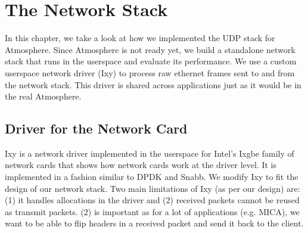 \chapter{The Network Stack} %

\label{Chapter4} %


In this chapter, we take a look at how we implemented the UDP stack for Atmosphere. Since Atmosphere is not ready yet, we build a standalone network stack that runs in the userspace and evaluate its performance. We use a custom userspace network driver (Ixy) to process raw ethernet frames sent to and from the network stack. This driver is shared across applications just as it would be in the real Atmosphere.

\section{Driver for the Network Card}

Ixy is a network driver implemented in the userspace for Intel's Ixgbe family of network cards that shows how network cards work at the driver level. It is implemented in a fashion similar to DPDK and Snabb. We modify Ixy to fit the design of our network stack. Two main limitations of Ixy (as per our design) are: (1) it handles allocations in the driver and (2) received packets cannot be reused as transmit packets. (2) is important as for a lot of applications (e.g. MICA), we want to be able to flip headers in a received packet and send it back to the client. 

